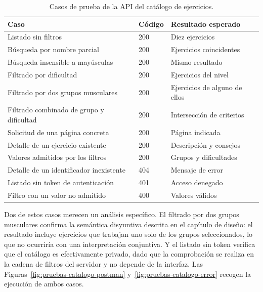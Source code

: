 \documentclass[12pt,a4paper,twoside,openright]{book}
\begin{document}
    \begin{table}[htbp]
        \centering
        \begin{tabular}{p{7cm} l p{4cm}}
            \toprule
            \textbf{Caso} & \textbf{Código} & \textbf{Resultado esperado} \\
            \midrule
            Listado sin filtros                        & 200 & Diez ejercicios \\
            Búsqueda por nombre parcial                & 200 & Ejercicios coincidentes \\
            Búsqueda insensible a mayúsculas           & 200 & Mismo resultado \\
            Filtrado por dificultad                    & 200 & Ejercicios del nivel \\
            Filtrado por dos grupos musculares         & 200 & Ejercicios de alguno de ellos \\
            Filtrado combinado de grupo y dificultad   & 200 & Intersección de criterios \\
            Solicitud de una página concreta           & 200 & Página indicada \\
            Detalle de un ejercicio existente          & 200 & Descripción y consejos \\
            Valores admitidos por los filtros          & 200 & Grupos y dificultades \\
            Detalle de un identificador inexistente    & 404 & Mensaje de error \\
            Listado sin token de autenticación         & 401 & Acceso denegado \\
            Filtro con un valor no admitido            & 400 & Valores válidos \\
            \bottomrule
        \end{tabular}
        \caption{Casos de prueba de la API del catálogo de ejercicios.}
        \label{tab:pruebas-catalogo}
    \end{table}

    Dos de estos casos merecen un análisis específico. El filtrado por dos grupos
    musculares confirma la semántica disyuntiva descrita en el capítulo de
    diseño: el resultado incluye ejercicios que trabajan uno solo de los grupos
    seleccionados, lo que no ocurriría con una interpretación conjuntiva. Y el
    listado sin token verifica que el catálogo es efectivamente privado, dado
    que la comprobación se realiza en la cadena de filtros del servidor y no
    depende de la interfaz. Las Figuras~\ref{fig:pruebas-catalogo-postman}
    y~\ref{fig:pruebas-catalogo-error} recogen la ejecución de ambos casos.
\end{document}

